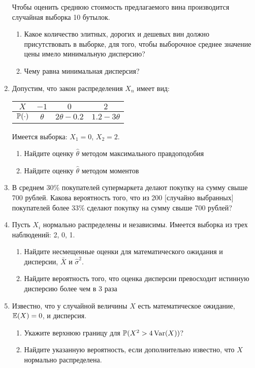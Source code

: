 \begin{enumerate}
Чтобы оценить среднюю стоимость предлагаемого вина производится
случайная выборка 10 бутылок.
\begin{enumerate}
\item Какое количество элитных, дорогих и дешевых вин должно
присутствовать в выборке, для того, чтобы выборочное среднее
значение цены имело минимальную дисперсию?
\item Чему равна минимальная дисперсия?
\end{enumerate}

\item Допустим, что закон распределения $X_{n}$ имеет вид:

\begin{tabular}{@{}cccc@{}}
\toprule
$X$      & $-1$     & $0$             & $2$             \\ \midrule
$\P(\cdot)$ & $\theta$ & $2\theta - 0.2$ & $1.2 - 3\theta$ \\ \bottomrule
\end{tabular}


Имеется выборка: $X_{1}=0$, $X_{2}=2$.
\begin{enumerate}
\item Найдите оценку $\hat{\theta}$ методом максимального правдоподобия
\item Найдите оценку $\hat{\theta}$ методом моментов
\end{enumerate}

\item В среднем 30\% покупателей супермаркета делают покупку на сумму
свыше 700 рублей. Какова вероятность того, что из 200 $[$случайно
выбранных$]$ покупателей
более 33\% сделают покупку на сумму свыше 700 рублей?

\item Пусть $X_{i}$ нормально распределены и
независимы. Имеется выборка
из трех наблюдений: 2, 0, 1.
\begin{enumerate}
\item Найдите несмещенные оценки для математического ожидания и
дисперсии, $\bar{X}$ и $\hat{\sigma}^{2}$.
\item Найдите вероятность того, что оценка дисперсии превосходит
истинную дисперсию более чем в 3 раза
\end{enumerate}

\item Известно, что у случайной величины $X$ есть
математическое
ожидание, $\E(X)=0$, и дисперсия.
\begin{enumerate}
\item Укажите верхнюю границу для $\P(X^{2}>4\Var(X))$?
\item Найдите указанную вероятность, если дополнительно известно, что
$X$ нормально распределена.
\end{enumerate}


\end{enumerate}
